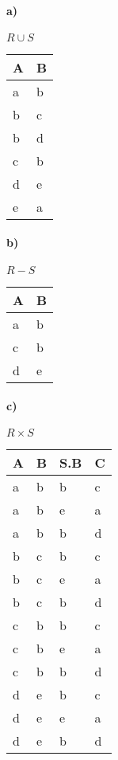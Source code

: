 \begin{multicols}{4}
		\paragraph{a)} $R\cup S$
	
	\hspace*{0.063cm}
	\begin{tabular}{| l | l |}
		\hline
		\rowcolor{TableHeader}\textbf{A} &  \textbf{B} \\
		\hline
		a & b\\
		\hline
		b & c\\
		\hline
		b & d\\
		\hline
		c & b\\
		\hline
		d & e\\
		\hline
		e & a\\
		\hline
	\end{tabular}
	
	\vfill\null
	
	\columnbreak
	\paragraph{b)} $R-S$

\hspace*{0.063cm}
\begin{tabular}{| l | l |}
	\hline
	\rowcolor{TableHeader}\textbf{A} &  \textbf{B} \\
	\hline
	a & b\\
	\hline
	c & b\\
	\hline
	d & e\\
	\hline
\end{tabular}

\vfill\null

\columnbreak
	\paragraph{c)} $R\times S$

\hspace*{0.063cm}
\begin{tabular}{| l | l | l | l |}
	\hline
	\rowcolor{TableHeader}\textbf{A} &  \textbf{B} & \textbf{S.B} &  \textbf{C}\\
	\hline
	a & b & b & c\\
	\hline
	a & b & e & a\\
	\hline
	a & b & b & d\\
	\hline
	b & c& b & c\\
	\hline
	b & c& e & a\\
	\hline
	b & c& b & d\\
	\hline
	c & b& b & c\\
	\hline
	c & b& e & a\\
	\hline
	c & b& b & d\\
	\hline
	d & e& b & c\\
	\hline
	d & e& e & a\\
	\hline
	d & e& b & d\\
	\hline
\end{tabular}


\end{multicols}
